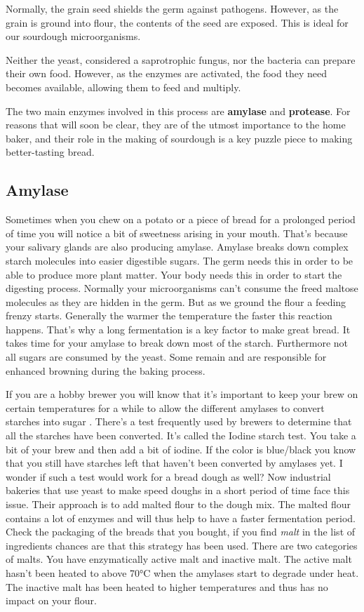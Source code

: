 Normally, the grain seed shields the germ against pathogens. However, as the
grain is ground into flour, the contents of the seed are exposed. This is ideal
for our sourdough microorganisms.

Neither the yeast, considered a saprotrophic fungus, nor the bacteria can
prepare their own food. However, as the enzymes are activated, the food they
need becomes available, allowing them to feed and multiply.

The two main enzymes involved in this process are \textbf{amylase} and
\textbf{protease}. For reasons that will soon be clear, they are of the utmost
importance to the home baker, and their role in the making of sourdough is a
key puzzle piece to making better-tasting bread.

\subsection{Amylase}

Sometimes when you chew on a potato or a piece of bread
for a prolonged period of time you will notice a bit of sweetness
arising in your mouth. That's because your salivary glands
are also producing amylase. Amylase breaks down complex
starch molecules into easier digestible sugars. The germ
needs this in order to be able to produce more plant matter.
Your body needs this in order to start the digesting process.
Normally your microorganisms can't consume the freed maltose molecules
as they are hidden in the germ. But as we ground the flour
a feeding frenzy starts. Generally the warmer the temperature
the faster this reaction happens. That's why a long fermentation
is a key factor to make great bread. It takes time
for your amylase to break down most of the starch. Furthermore
not all sugars are consumed by the yeast. Some remain and
are responsible for enhanced browning during the baking
process.

If you are a hobby brewer you will know that it's
important to keep your brew on certain temperatures for a
while to allow the different amylases to convert starches
into sugar \cite{beer+amylase}. There's a test frequently used by brewers
to determine that all the starches have been converted.
It's called the Iodine starch test. You take a bit of your brew
and then add a bit of iodine. If the color is blue/black
you know that you still have starches left that haven't been
converted by amylases yet. I wonder if such a test would work
for a bread dough as well? Now industrial bakeries
that use yeast to make speed doughs in a short period of
time face this issue. Their approach is to add malted
flour to the dough mix. The malted flour contains a lot
of enzymes and will thus help to have a faster fermentation
period. Check the packaging of the breads that you bought,
if you find {\it malt} in the list of ingredients chances
are that this strategy has been used. There are two categories
of malts. You have enzymatically active malt and inactive
malt. The active malt hasn't been heated to above 70°C
when the amylases start to degrade under heat. The inactive
malt has been heated to higher temperatures and thus
has no impact on your flour.

